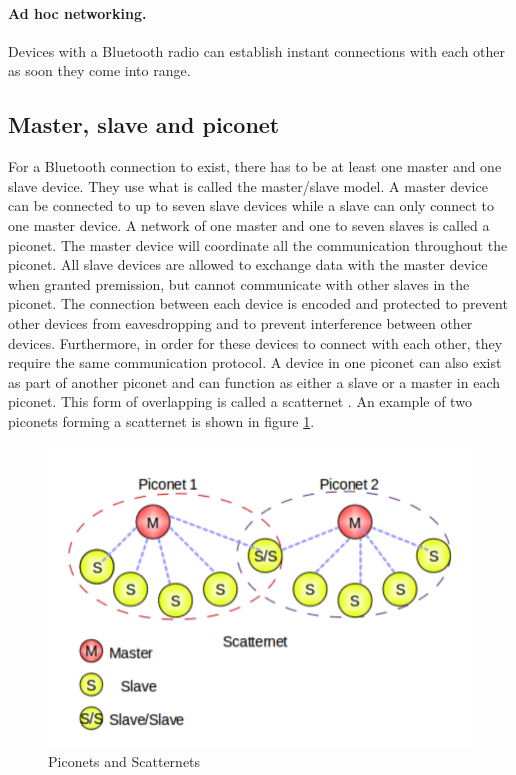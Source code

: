 \documentclass[a4paper, 11pt]{report}
\begin{document}
		\paragraph{Ad hoc networking.}
Devices with a Bluetooth radio can establish instant connections with each other as soon they come into range.


	\subsection{Master, slave and piconet}
For a Bluetooth connection to exist, there has to be at least one master and one slave device. They use what is called the master/slave model. A master device can be connected to up to seven slave devices while a slave can only connect to one master device. A network of one master and one to seven slaves is called a piconet. The master device will coordinate all the communication throughout the piconet. All slave devices are allowed to exchange data with the master device when granted premission, but cannot communicate with other slaves in the piconet. The connection between each device is encoded and protected to prevent other devices from eavesdropping and to prevent interference between other devices. Furthermore, in order for these devices to connect with each other, they require the same communication protocol. A device in one piconet can also exist as part of another piconet and can function as either a slave or a master in each piconet. This form of overlapping is called a scatternet \cite{introBluetooth}. An example of two piconets forming a scatternet is shown in figure \ref{fig:scatternet}.

	\begin{figure}[ht]
		\centering	
		\includegraphics[scale=0.60]{images/scatternet.pdf} 
		\caption{Piconets and Scatternets}\label{fig:scatternet}
	\end{figure}
\end{document}
